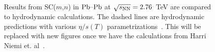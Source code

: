 \begin{figure}[h]
            \begin{center}
              \end{center}
        \caption{Results from SC($m$,$n$) in $\textnormal{Pb--Pb}$ at $\sqrt{s_{\textnormal{NN}}}=2.76$~TeV are compared to hydrodynamic calculations. The dashed lines are hydrodynamic predictions with various $\eta/s(T)$ parametrizations~\cite{Niemi:2015qia}. This will be replaced with new figures once we have the calculations from Harri Niemi et. al~\cite{Niemi:2015qia}.}
        \label{fig:Figure_5}
\end{figure}

